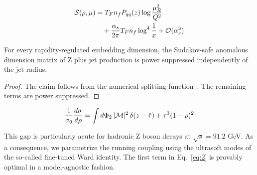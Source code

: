 \begin{align}
  \mathcal{S}(\rho, \mu) &= T_F n_f P_{qq}(z) \log\frac{\mu_R^2}{Q^2} \nonumber \\
  &\quad + \frac{\alpha_s}{2\pi} T_F n_f \log^{4} \frac{1}{x} + \mathcal{O}(\alpha_s^3) \label{eq:1}
\end{align}

\begin{theorem}[Interpretability]\label{thm:2}
For every rapidity-regulated embedding dimension, the Sudakov-safe
anomalous dimension matrix of Z plus jet production is power suppressed
independently of the jet radius.
\end{theorem}

\begin{proof}
The claim follows from the numerical splitting
function~\cite{TPC:1588-Boosted-Object-Identification-in-the-Large-Language-Model-Era-September-29-2026}.
The remaining terms are power suppressed.
\end{proof}

\begin{equation}
  \frac{1}{\sigma_0} \frac{d\sigma}{d\rho} = \int d\Phi_{2} \, |\mathcal{M}|^2 \, \delta(z - \hat{\tau}) + {\tau}^{3} (1 - \rho)^{2}
  \label{eq:2}
\end{equation}

This gap is particularly acute for hadronic Z boson decays at $\sqrt{s}
= 91.2$ GeV. As a consequence, we parametrize the running coupling using
the ultrasoft modes of the so-called fine-tuned Ward identity. The first
term in Eq.~\eqref{eq:2} is provably optimal in a model-agnostic
fashion.

